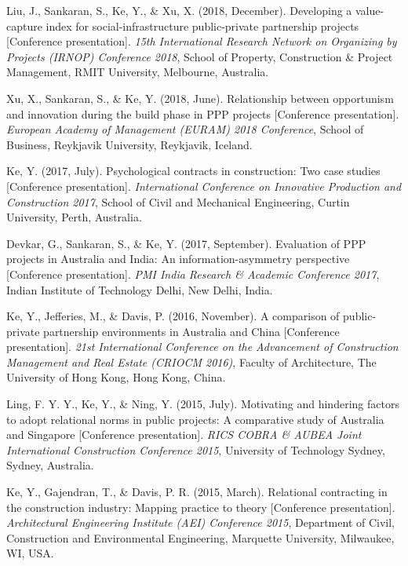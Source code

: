\documentclass[11pt,a4paper]{report} %
\begin{document}
\begin{tablist}
        \item[2018] \tab{}Liu, J., Sankaran, S., Ke, Y., \& Xu, X. (2018, December). Developing a value-capture index for social-infrastructure public-private partnership projects [Conference presentation]. \textit{15th International Research Network on Organizing by Projects (IRNOP) Conference 2018}, School of Property, Construction \& Project Management, RMIT University, Melbourne, Australia.
        
        \item[2018] \tab{}Xu, X., Sankaran, S., \& Ke, Y. (2018, June). Relationship between opportunism and innovation during the build phase in PPP projects [Conference presentation]. \textit{European Academy of Management (EURAM) 2018 Conference}, School of Business, Reykjavik University, Reykjavik, Iceland.
        
        \item[2017] \tab{}Ke, Y. (2017, July). Psychological contracts in construction: Two case studies [Conference presentation]. \textit{International Conference on Innovative Production and Construction 2017}, School of Civil and Mechanical Engineering, Curtin University, Perth, Australia.
        
        \item[2017] \tab{}Devkar, G., Sankaran, S., \& Ke, Y. (2017, September). Evaluation of PPP projects in Australia and India: An information-asymmetry perspective [Conference presentation]. \textit{PMI India Research \& Academic Conference 2017}, Indian Institute of Technology Delhi, New Delhi, India.
        
        \item[2016] \tab{}Ke, Y., Jefferies, M., \& Davis, P. (2016, November). A comparison of public-private partnership environments in Australia and China [Conference presentation]. \textit{21st International Conference on the Advancement of Construction Management and Real Estate (CRIOCM 2016)}, Faculty of Architecture, The University of Hong Kong, Hong Kong, China.
        
        \item[2015] \tab{}Ling, F. Y. Y., Ke, Y., \& Ning, Y. (2015, July). Motivating and hindering factors to adopt relational norms in public projects: A comparative study of Australia and Singapore [Conference presentation]. \textit{RICS COBRA \& AUBEA Joint International Construction Conference 2015}, University of Technology Sydney, Sydney, Australia.
        
        \item[2015] \tab{}Ke, Y., Gajendran, T., \& Davis, P. R. (2015, March). Relational contracting in the construction industry: Mapping practice to theory [Conference presentation]. \textit{Architectural Engineering Institute (AEI) Conference 2015}, Department of Civil, Construction and Environmental Engineering, Marquette University, Milwaukee, WI, USA.
        

\end{tablist}
\end{document}
